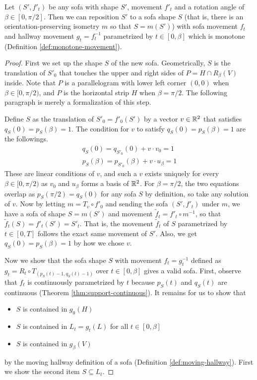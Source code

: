 \begin{theorem}
\label{thm:monotone-movement}
Let $(S', f'_t)$ be any sofa with shape $S'$, movement $f'_t$ and a rotation angle of $\beta \in [0, \pi / 2]$.
Then we can reposition $S'$ to a sofa shape $S$ (that is, there is an orientation-preserving isometry $m$ so that $S = m(S')$) with sofa movement $f_t$ and hallway movement $g_t = f_t^{-1}$ parametrized by $t \in [0, \beta]$ which is monotone (Definition \ref{def:monotone-movement}).
\end{theorem}
\begin{proof}
First we set up the shape $S$ of the new sofa.
Geometrically, $S$ is the translation of $S'_0$ that touches the upper and right sides of $P = H \cap R_\beta(V)$ inside.
Note that $P$ is a parallelogram with lower left corner $(0, 0)$ when $\beta \in [0, \pi / 2)$, and $P$ is the horizontal strip $H$ when $\beta = \pi / 2$.
The following paragraph is merely a formalization of this step.

Define $S$ as the translation of $S'_0 = f'_0(S')$ by a vector $v \in \mathbb{R}^2$ that satisfies $q_{S}(0) = p_{S}(\beta) = 1$.
The condition for $v$ to satisfy $q_{S}(0) = p_{S}(\beta) = 1$ are the followings.
\begin{gather*}
	q_{S}(0) = q_{S'_0}(0) + v \cdot v_0 = 1\\
	p_{S}(\beta) = p_{S'_0}(\beta) + v \cdot u_\beta = 1
\end{gather*} 
These are linear conditions of $v$, and such a $v$ exists uniquely for every $\beta \in [0, \pi / 2)$ as $v_0$ and $u_\beta$ forms a basis of $\mathbb{R}^2$.
For $\beta = \pi / 2$, the two equations overlap as $p_S(\pi / 2) = q_S(0)$ for any sofa $S$ by definition, so take any solution of $v$.
Now by letting $m = T_v \circ f'_0$ and sending the sofa $(S', f'_t)$ under $m$, we have a sofa of shape $S = m(S')$ and movement $\tilde{f}_t = f'_t \circ m^{-1}$, so that $\tilde{f}_t(S) = f'_t(S') = S'_t$. That is, the movement $\tilde{f}_t$ of $S$ parametrized by $t \in [0, T]$ follows the exact same movement of $S'$.
Also, we get $q_S(0) = p_S(\beta) = 1$ by how we chose $v$. 

Now we show that the sofa shape $S$ with movement $f_t = g_t^{-1}$ defined as $g_t = R_t \circ T_{(p_{S}(t) -1, q_{S}(t) -1)}$ over $t \in [0, \beta]$ gives a valid sofa.
First, observe that $f_t$ is continuously parametrized by $t$ because $p_S(t)$ and $q_S(t)$ are continuous (Theorem \ref{thm:support-continuous}).
It remains for us to show that 
\begin{itemize}
	\item $S$ is contained in $g_0(H)$
	\item $S$ is contained in $L_t = g_t(L)$ for all $t \in [0, \beta]$
	\item $S$ is contained in $g_\beta(V)$
\end{itemize}
by the moving hallway definition of a sofa (Definition \ref{def:moving-hallway}). 
First we show the second item $S \subseteq L_t$.


\end{proof}
